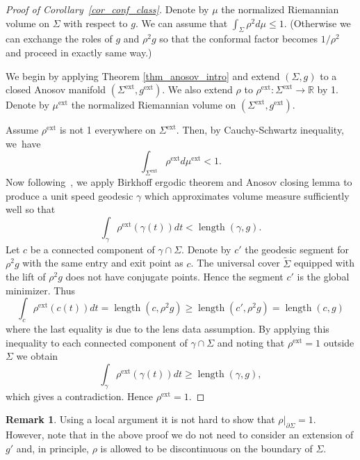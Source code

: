 \documentclass[10pt]{amsart}
\newcommand{\ext}{\mathrm{ext}}
\DeclareMathOperator{\length}{length}
\theoremstyle{definition}
\newtheorem{remark}[theorem]{Remark}
\newcommand{\field}[1]{\mathbb{#1}}
\newcommand{\R}{\field{R}}
\renewcommand{\>}{{\rangle}}
\newcommand{\<}{{\langle}}
\begin{document}
\begin{proof}[Proof of Corollary~\ref{cor_conf_class}]
Denote by $\mu$ the normalized Riemannian volume on $\Sigma$ with respect to $g$. We can assume that $\int_\Sigma\rho^2d\mu\le 1$. (Otherwise we can exchange the roles of $g$ and $\rho^2g$ so that the conformal factor becomes $1/\rho^2$ and proceed in exactly same way.)

We begin by applying Theorem \ref{thm_anosov_intro} and extend $(\Sigma, g)$ to a closed Anosov manifold $(\Sigma^{\ext}, g^{\ext})$. We also extend $\rho$ to $\rho^{\ext}\colon \Sigma^{\ext}\to\R$ by 1. Denote by $\mu^{\ext}$ the normalized Riemannian volume on $(\Sigma^{\ext}, g^{\ext})$.

Assume $\rho^{\ext}$ is not 1 everywhere on $\Sigma^{\ext}$. Then, by Cauchy-Schwartz inequality, we~have\vspace*{-3pt}
\[
\int_{\Sigma^{\ext}}\rho^{\ext}d\mu^{\ext}<1.
\]
Now following~\cite[Th.\,2]{K88}, we apply Birkhoff ergodic theorem and Anosov closing lemma to produce a unit speed geodesic $\gamma$ which approximates volume measure sufficiently well so that\vspace*{-3pt}
\[
\int_{\gamma}\rho^{\ext}(\gamma(t))dt<\length(\gamma, g).
\]
Let $c$ be a connected component of $\gamma\cap\Sigma$. Denote by $c'$ the geodesic segment for $\rho^2g$ with the same entry and exit point as $c$. The universal cover $\tilde\Sigma$ equipped with the lift of $\rho^2g$ does not have conjugate points. Hence the segment $c'$ is the global minimizer. Thus\vspace*{-3pt}
\[
\int_{c}\rho^{\ext}(c(t))dt=\length(c, \rho^2g)\ge \length(c', \rho^2g)=\length(c, g)
\]
where the last equality is due to the lens data assumption. By applying this inequality to each connected component of $\gamma\cap\Sigma$ and noting
that $\rho^{\ext}=1$ outside $\Sigma$ we obtain\vspace*{-3pt}
\[
\int_{\gamma}\rho^{\ext}(\gamma(t))dt\ge \length(\gamma, g),
\]
which gives a contradiction. Hence $\rho^{\ext}=1$.
\end{proof}

\begin{remark} Using a local argument it is not hard to show that $\rho|_{\partial\Sigma}=1$. However, note that in the above proof we do not need to consider an extension of $g'$ and, in principle, $\rho$ is allowed to be discontinuous on the boundary of $\Sigma$.
\end{remark}
\end{document}
